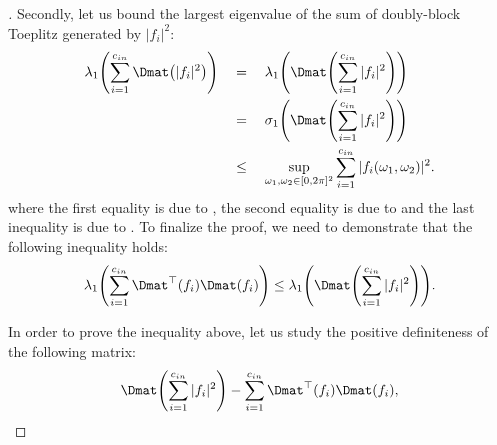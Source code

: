 \begin{proof}[]
\noindent
Secondly, let us bound the largest eigenvalue of the sum of doubly-block Toeplitz generated by $|f_i|^2$:
\begin{align}
  \lambda_1 \left( \sum_{i=1}^{\cin} \Dmat \left(|f_i|^2 \right) \right) \quad &= \quad \lambda_1 \left( \Dmat \left( \sum_{i=1}^{\cin} |f_i|^2 \right) \right) \\ 
  \quad &= \quad \sigma_1 \left( \Dmat \left( \sum_{i=1}^{\cin} |f_i|^2 \right) \right) \\
  \quad &\leq \quad \sup_{\omega_1, \omega_2 \in [0, 2\pi]^2} \sum_{i=1}^{\cin} |f_i(\omega_1, \omega_2)|^2.
\end{align}
where the first equality is due to , the second equality is due to  and the last inequality is due to .
To finalize the proof, we need to demonstrate that the following inequality holds:
\begin{equation} \label{equation:ch5-eq2}
    \lambda_1 \left( \sum_{i=1}^{\cin} \Dmat^{\top} \left(f_i \right) \Dmat (f_i) \right) \leq \lambda_1 \left( \Dmat \left( \sum_{i=1}^{\cin} |f_i|^2 \right) \right). 
\end{equation}

\noindent
In order to prove the inequality above, let us study the positive definiteness of the following matrix:
\begin{equation}
  \Dmat \left( \sum_{i=1}^{\cin} |f_i|^2 \right) - \sum_{i=1}^{\cin} \Dmat^{\top} \left(f_i \right) \Dmat (f_i),
  \label{equation:ch5-eq3}
\end{equation}


\end{proof}
